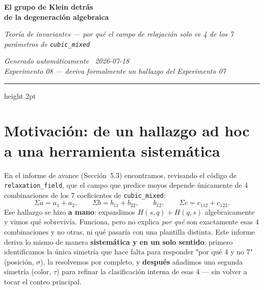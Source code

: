 \documentclass[11pt, a4paper]{article}
\begin{document}
\thispagestyle{fancy}

\vspace*{4pt}
{\color{cNavy}\Huge\bfseries El grupo de Klein detr\'as}\\[3pt]
{\color{cNavy}\Large\bfseries de la degeneraci\'on algebraica}

\vspace{6pt}
{\color{cMuted}\large\itshape
  Teor\'ia de invariantes --- por qu\'e el campo de relajaci\'on solo ve
  4 de los 7 par\'ametros de \texttt{cubic\_mixed}}

\vspace{4pt}
{\color{cMuted}\small\itshape Generado autom\'aticamente \textbullet\ 2026-07-18}\\[1pt]
{\color{cMuted}\small\itshape
  Experimento 08 --- deriva formalmente un hallazgo del Experimento 07}

\vspace{8pt}
{\color{cAccent}\hrule height 2pt}
\vspace{10pt}

\section{Motivaci\'on: de un hallazgo ad hoc a una herramienta sistem\'atica}

En el informe de avance (Secci\'on~5.3) encontramos, revisando el
c\'odigo de \texttt{relaxation\_field}, que el campo que predice moyos
depende \'unicamente de 4 combinaciones de los 7 coeficientes de
\texttt{cubic\_mixed}:
\[
\Sigma a = a_1+a_2, \qquad \Sigma b = b_{11}+b_{22}, \qquad b_{12},
\qquad \Sigma c = c_{112}+c_{122}.
\]
Ese hallazgo se hizo \textbf{a mano}: expandimos $H(s,q)+H(q,s)$
algebraicamente y vimos qu\'e sobreviv\'ia. Funciona, pero no explica
\emph{por qu\'e} son exactamente esas 4 combinaciones y no otras, ni
qu\'e pasar\'ia con una plantilla distinta. Este informe deriva lo
mismo de manera \textbf{sistem\'atica y en un solo sentido}: primero
identificamos la \'unica simetr\'ia que hace falta para responder
"por qu\'e 4 y no 7" (posici\'on, $\sigma$), la resolvemos por
completo, y \textbf{despu\'es} a\~nadimos una segunda simetr\'ia
(color, $\tau$) para refinar la clasificaci\'on interna de esas 4 ---
sin volver a tocar el conteo principal.

\end{document}
